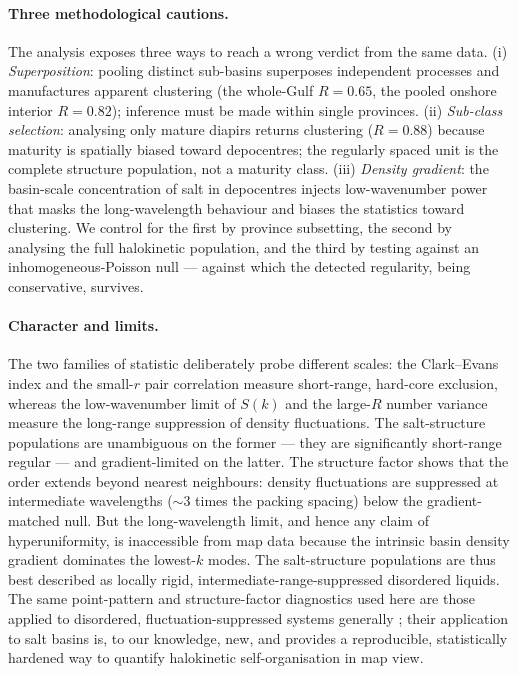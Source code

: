 \documentclass[11pt]{article}
\begin{document}
\paragraph{Three methodological cautions.}
The analysis exposes three ways to reach a wrong verdict from the same data. (i) \emph{Superposition}:
pooling distinct sub-basins superposes independent processes and manufactures apparent clustering (the
whole-Gulf $R=0.65$, the pooled onshore interior $R=0.82$); inference must be made within single provinces.
(ii) \emph{Sub-class selection}: analysing only mature diapirs returns clustering ($R=0.88$) because
maturity is spatially biased toward depocentres; the regularly spaced unit is the complete structure
population, not a maturity class. (iii) \emph{Density gradient}: the basin-scale concentration of salt in
depocentres injects low-wavenumber power that masks the long-wavelength behaviour and biases the statistics
toward clustering. We control for the first by province subsetting, the second by analysing the full
halokinetic population, and the third by testing against an inhomogeneous-Poisson null --- against which the
detected regularity, being conservative, survives.

\paragraph{Character and limits.}
The two families of statistic deliberately probe different scales: the Clark--Evans index and the
small-$r$ pair correlation measure short-range, hard-core exclusion, whereas the low-wavenumber limit of
$S(k)$ and the large-$R$ number variance measure the long-range suppression of density fluctuations. The
salt-structure populations are unambiguous on the former --- they are significantly short-range regular ---
and gradient-limited on the latter. The structure factor shows that the order extends beyond nearest
neighbours: density fluctuations are
suppressed at intermediate wavelengths ($\sim$3 times the packing spacing) below the gradient-matched null.
But the long-wavelength limit, and hence any claim of hyperuniformity, is inaccessible from map data because
the intrinsic basin density gradient dominates the lowest-$k$ modes. The salt-structure populations are thus
best described as locally rigid, intermediate-range-suppressed disordered liquids. The same point-pattern
and structure-factor diagnostics used here are those applied to disordered, fluctuation-suppressed systems
generally \citep{torquato2018}; their application to salt basins is, to our knowledge, new, and provides a
reproducible, statistically hardened way to quantify halokinetic self-organisation in map view.
\end{document}
